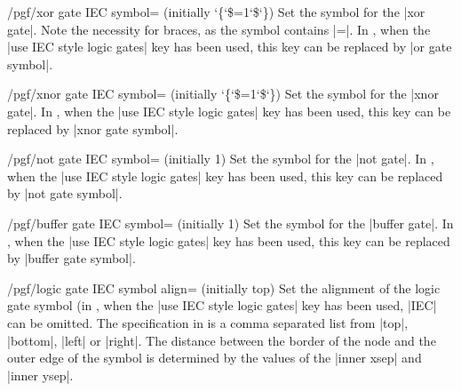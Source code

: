 \begin{key}{/pgf/xor gate IEC symbol= (initially \char`\{\char`\$=1\char`\$\char`\})}
  Set the symbol for the |xor gate|. Note the necessity for braces,
  as the symbol contains |=|.
  In \tikzname, when the |use IEC style logic gates| key has been 
  used, this key can be replaced by |or gate symbol|.
\end{key}

\begin{key}{/pgf/xnor gate IEC symbol= (initially  \char`\{\char`\$=1\char`\$\char`\})}
  Set the symbol for the |xnor gate|.  
  In \tikzname, when the |use IEC style logic gates| key has been 
  used, this key can be replaced by |xnor gate symbol|.
\end{key}

\begin{key}{/pgf/not gate IEC symbol= (initially 1)}
  Set the symbol for the |not gate|.  
  In \tikzname, when the |use IEC style logic gates| key has been 
  used, this key can be replaced by |not gate symbol|.
\end{key}

\begin{key}{/pgf/buffer gate IEC symbol= (initially 1)}
  Set the symbol for the |buffer gate|.  
  In \tikzname, when the |use IEC style logic gates| key has been 
  used, this key can be replaced by |buffer gate symbol|.
\end{key}

\begin{key}{/pgf/logic gate IEC symbol align= (initially top)}
  Set the alignment of the logic gate symbol (in \tikzname, when the 
  |use IEC style logic gates| key has been used, |IEC| can be omitted.
  The specification in  is a comma separated list from
  |top|, |bottom|, |left| or |right|. The distance between the border
  of the node and the outer edge of the symbol is determined by the values 
  of the |inner xsep| and |inner ysep|.
  
\begin{codeexample}[]
\end{codeexample} 

\end{key}


